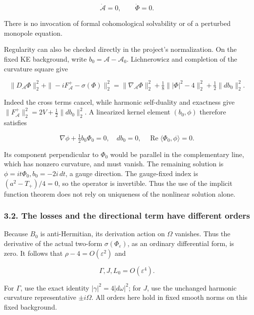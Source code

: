 \documentclass[
  10pt,
]{article}
\begin{document}
\[
                    \dot{\mathcal A}=0,\qquad\dot\Phi=0.      \tag{3.3}
\]

There is no invocation of formal cohomological solvability or of a
perturbed monopole equation.

Regularity can also be checked directly in the project's normalization.
On the fixed KE background, write \(b_0=\mathcal A-\mathcal A_0\).
Lichnerowicz and completion of the curvature square give

\[
 \|D_{\mathcal A}\Phi\|_2^2+
 \|-iF_{\mathcal A}^+-\sigma(\Phi)\|_2^2
 =\|\nabla_{\mathcal A}\Phi\|_2^2
   +\tfrac18\||\Phi|^2-4\|_2^2+\tfrac12\|db_0\|_2^2.        \tag{3.3a}
\]

Indeed the cross terms cancel, while harmonic self-duality and exactness
give \(\|F_{\mathcal A}^+\|_2^2=2V+\frac12\|db_0\|_2^2\). A linearized
kernel element \((b_0,\phi)\) therefore satisfies

\[
 \nabla\phi+\tfrac12b_0\Phi_0=0,\quad db_0=0,\quad
 \operatorname{Re}\langle\Phi_0,\phi\rangle=0.
\]

Its component perpendicular to \(\Phi_0\) would be parallel in the
complementary line, which has nonzero curvature, and must vanish. The
remaining solution is \(\phi=it\Phi_0, b_0=-2i\,dt\), a gauge direction.
The gauge-fixed index is \((a^2-T_+)/4=0\), so the operator is
invertible. Thus the use of the implicit function theorem does not rely
on uniqueness of the nonlinear solution alone.

\hypertarget{the-losses-and-the-directional-term-have-different-orders}{%
\subsubsection{3.2. The losses and the directional term have different
orders}\label{the-losses-and-the-directional-term-have-different-orders}}

Because \(B_0\) is anti-Hermitian, its derivation action on \(\Omega\)
vanishes. Thus the derivative of the actual two-form
\(\sigma(\Phi_\varepsilon)\), as an ordinary differential form, is zero.
It follows that \(\rho-4=O(\varepsilon^2)\) and

\[
                 \Gamma,J,L_0=O(\varepsilon^4).                \tag{3.4}
\]

For \(\Gamma\), use the exact identity \(|\gamma|^2=4|d\omega|^2\); for
\(J\), use the unchanged harmonic curvature representative
\(\pm i\Omega\). All orders here hold in fixed smooth norms on this
fixed background.
\end{document}
